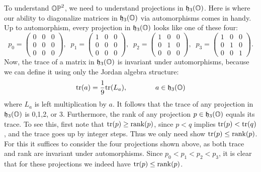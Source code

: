 To understand ${\mathbb {OP}}^2$, we need to understand projections in ${\mathfrak {h}}_3({\mathbb O})$.  
Here is where our ability to diagonalize matrices in ${\mathfrak {h}}_3({\mathbb O})$ via 
automorphisms comes in handy.  Up to automorphism, every projection in 
${\mathfrak {h}}_3({\mathbb O})$ looks like one of these four: 
\[  
p_0 = 
\left( \begin{array}{ccc}  
                         0  &  0  & 0         \\  
                         0  &  0  & 0           \\ 
                         0  &  0  & 0   \end{array} \right) , \; \;
p_1 =  
\left( \begin{array}{ccc}  
                         1  &  0  & 0         \\  
                         0  &  0  & 0           \\ 
                         0  &  0  & 0   \end{array} \right) , \; \;
p_2 =  
\left( \begin{array}{ccc}  
                         1  &  0  & 0         \\  
                         0  &  1  & 0           \\ 
                         0  &  0  & 0   \end{array} \right) , \; \;
p_3 =  
\left( \begin{array}{ccc}  
                         1  &  0  & 0         \\  
                         0  &  1  & 0           \\ 
                         0  &  0  & 1   \end{array} \right) .  \] 
Now, the trace of a matrix in ${\mathfrak {h}}_3({\mathbb O})$ is invariant under 
automorphisms, because we can define it using only the Jordan algebra 
structure: 
\[        {\rm tr}(a) = {1\over 9} {\rm tr}(L_a)    , \qquad \qquad a \in {\mathfrak {h}}_3({\mathbb O}) \] 
where $L_a$ is left multiplication by $a$.  It follows that the trace of
any projection in ${\mathfrak {h}}_3({\mathbb O})$ is 0,1,2, or 3.  Furthermore, the rank of
any projection $p \in {\mathfrak {h}}_3({\mathbb O})$ equals its trace.  To see this, first
note that ${\rm tr}(p) \ge {\rm rank}(p)$, since $p < q$ implies ${\rm tr}(p) <
{\rm tr}(q)$, and the trace goes up by integer steps.  Thus we only need
show ${\rm tr}(p) \le {\rm rank}(p)$.  For this it suffices to consider the four
projections shown above, as both trace and rank are invariant under
automorphisms.  Since $p_0 < p_1 < p_2 < p_3$, it is clear that for
these projections we indeed have ${\rm tr}(p) \le {\rm rank}(p)$.

